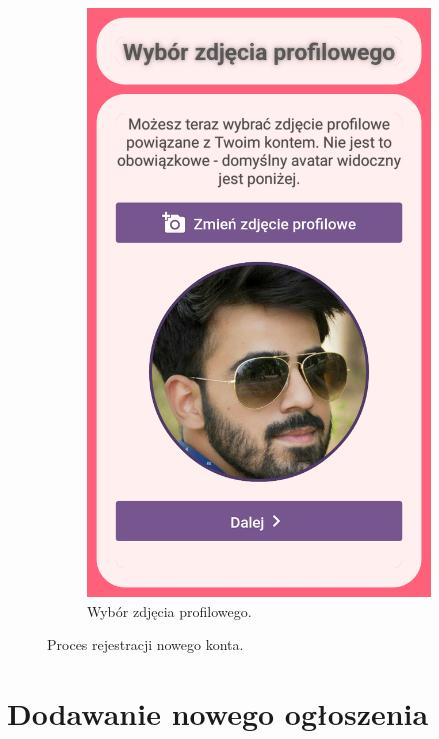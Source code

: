 \documentclass[licencjacka]{pracamgr}
\begin{document}
\begin{figure}[H]
\begin{subfigure}[b]{0.4\linewidth}
\begin{framed}
      \includegraphics[width=\linewidth]{rejestracja3.png}
    \end{framed}
    \caption{Wybór zdjęcia profilowego.}
  \end{subfigure}
  \caption{Proces rejestracji nowego konta.}
  \label{fig:registration}
\end{figure}

\section{Dodawanie nowego ogłoszenia}
\end{document}
